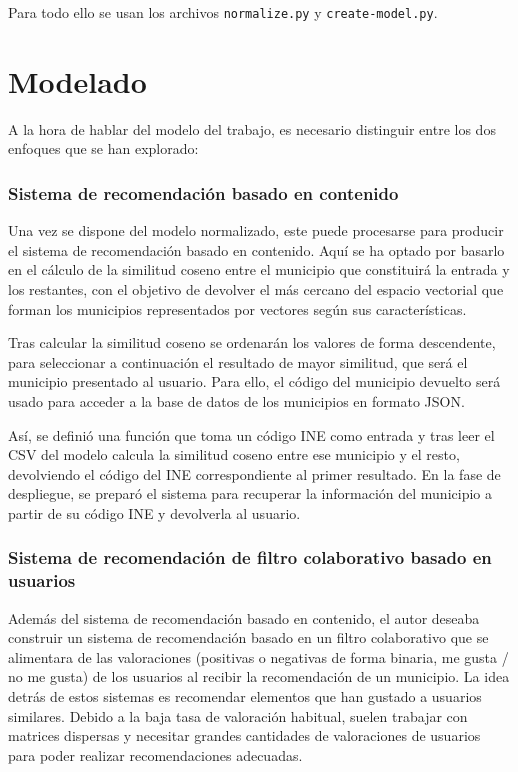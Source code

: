 Para todo ello se usan los archivos \texttt{normalize.py} y \texttt{create-model.py}.

\section{Modelado}

A la hora de hablar del modelo del trabajo, es necesario distinguir entre los dos enfoques que se han explorado:

\subsubsection{Sistema de recomendación basado en contenido}

Una vez se dispone del modelo normalizado, este puede procesarse para producir el sistema de recomendación basado en contenido. Aquí se ha optado por basarlo en el cálculo de la similitud coseno entre el municipio que constituirá la entrada y los restantes, con el objetivo de devolver el más cercano del espacio vectorial que forman los municipios representados por vectores según sus características.

Tras calcular la similitud coseno se ordenarán los valores de forma descendente, para seleccionar a continuación el resultado de mayor similitud, que será el municipio presentado al usuario. Para ello, el código del municipio devuelto será usado para acceder a la base de datos de los municipios en formato JSON.


Así, se definió una función que toma un código INE como entrada y tras leer el CSV del modelo calcula la similitud coseno entre ese municipio y el resto, devolviendo el código del INE correspondiente al primer resultado. En la fase de despliegue, se preparó el sistema para recuperar la información del municipio a partir de su código INE y devolverla al usuario.

\subsubsection{Sistema de recomendación de filtro colaborativo basado en usuarios}

Además del sistema de recomendación basado en contenido, el autor deseaba construir un sistema de recomendación basado en un filtro colaborativo que se alimentara de las valoraciones (positivas o negativas de forma binaria, \guillemotleft me gusta / no me gusta\guillemotright) de los usuarios al recibir la recomendación de un municipio. La idea detrás de estos sistemas es recomendar elementos que han gustado a usuarios similares. Debido a la baja tasa de valoración habitual, suelen trabajar con matrices dispersas y necesitar grandes cantidades de valoraciones de usuarios para poder realizar recomendaciones adecuadas.

